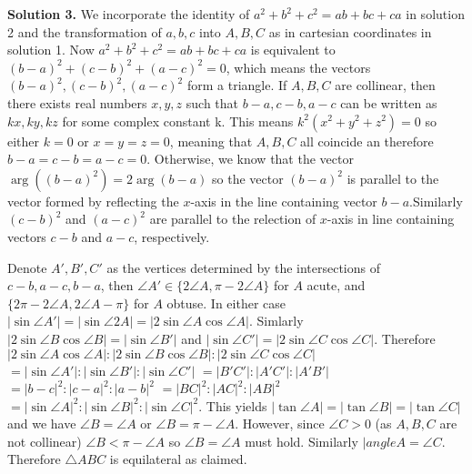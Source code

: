 \documentclass[11pt]{article}
\begin{document}
\begin{enumerate}
\textbf {Solution 3.} We incorporate the identity of $a^2+b^2+c^2=ab+bc+ca$ in solution 2 and the transformation of $a,b,c$ into $A,B,C$ as in cartesian coordinates in solution 1. Now $a^2+b^2+c^2=ab+bc+ca$ is equivalent to $(b-a)^2+(c-b)^2+(a-c)^2=0$, which means the vectors $(b-a)^2, (c-b)^2, (a-c)^2$ form a triangle. If $A,B,C$ are collinear, then there exists real numbers $x, y, z$ such that $b-a, c-b, a-c$ can be written as $kx, ky, kz$ for some complex constant k. This means $k^2(x^2+y^2+z^2)=0$ so either $k=0$ or $x=y=z=0$, meaning that $A,B,C$ all coincide an therefore $b-a=c-b=a-c=0$. Otherwise, we know that the vector $\arg ((b-a)^2)=2\arg (b-a)$ so the vector $(b-a)^2$ is parallel to the vector formed by reflecting the $x$-axis in the line containing vector $b-a$.Similarly $(c-b)^2$ and $(a-c)^2$ are parallel to the relection of $x$-axis in line containing vectors $c-b$ and $a-c$, respectively.

Denote $A', B', C'$ as the vertices determined by the intersections of $c-b, a-c, b-a$, then $\angle A'\in \{2\angle A, \pi -2\angle A\}$ for $A$ acute, and $\{2\pi-2\angle A, 2\angle A-\pi\}$ for $A$ obtuse. In either case $|\sin\angle A'|=|\sin\angle 2A|=|2\sin\angle A\cos\angle A|$. Simlarly $|2\sin\angle B\cos\angle B|=|\sin\angle B'|$ and $|\sin\angle C'|=|2\sin\angle C\cos\angle C|$. Therefore $|2\sin\angle A\cos\angle A|:|2\sin\angle B\cos\angle B|:|2\sin\angle C\cos\angle C|$
$=|\sin\angle A'|:|\sin\angle B'|:|\sin\angle C'|$
$=|B'C'|:|A'C'|:|A'B'|$
$=|b-c|^2:|c-a|^2:|a-b|^2$
$=|BC|^2:|AC|^2:|AB|^2$
$=|\sin\angle A|^2:|\sin\angle B|^2:|\sin\angle C|^2$.
This yields $|\tan\angle A|=|\tan\angle B|=|\tan\angle C|$ and we have $\angle B=\angle A$ or $\angle B=\pi-\angle A$. However, since $\angle C>0$ (as $A,B,C$ are not collinear) $\angle B<\pi-\angle A$ so $\angle B=\angle A$ must hold. Similarly $|angle A=\angle C$. Therefore $\triangle ABC$ is equilateral as claimed.

\end{enumerate}
\end{document}
